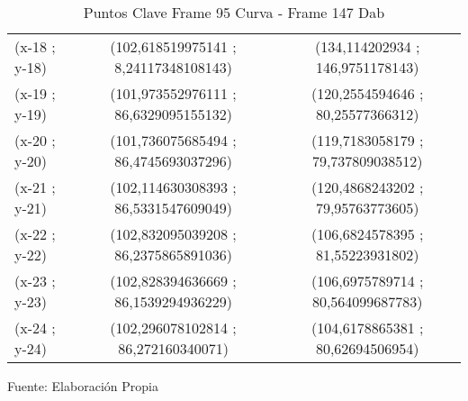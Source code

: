 \begin{table}[htbp]
\begin{tabular}{|l|c|c|}
		(x-18 ; y-18) & (102,618519975141 ; 8,24117348108143) & (134,114202934 ; 146,9751178143) \\
		(x-19 ; y-19) & (101,973552976111 ; 86,6329095155132) & (120,2554594646 ; 80,25577366312) \\
		(x-20 ; y-20) & (101,736075685494 ; 86,4745693037296) & (119,7183058179 ; 79,737809038512) \\
		(x-21 ; y-21) & (102,114630308393 ; 86,5331547609049) & (120,4868243202 ; 79,95763773605) \\
		(x-22 ; y-22) & (102,832095039208 ; 86,2375865891036) & (106,6824578395 ; 81,55223931802) \\
		(x-23 ; y-23) & (102,828394636669 ; 86,1539294936229) & (106,6975789714 ; 80,564099687783) \\
		(x-24 ; y-24) & (102,296078102814 ; 86,272160340071) & (104,6178865381 ; 80,62694506954) \\ \hline
	\end{tabular}%
	\caption{Puntos Clave Frame 95 Curva - Frame 147 Dab }
	\footnotesize Fuente: Elaboración Propia
	\label{checkerporcentage2}
\end{table}%

\clearpage
\restoregeometry
{}
\text{  }
\linebreak[4] \null
\linebreak[4] \null
\linebreak[4] \null
\linebreak[4] \null 

